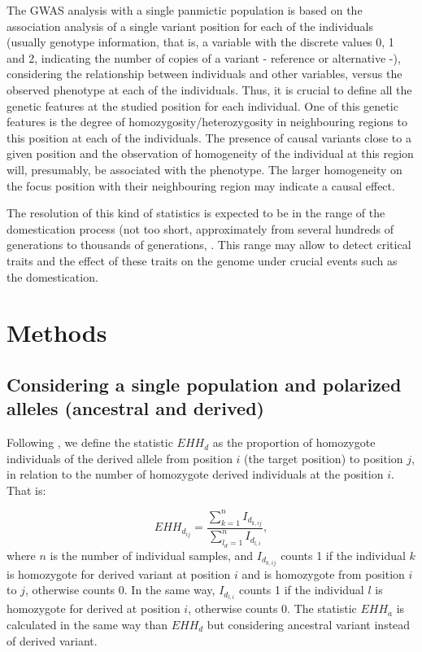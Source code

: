 \documentclass[a4paper,11pt]{article}
\begin{document}
The GWAS analysis with a single panmictic population is based on the association analysis of a single variant position for each of the individuals (usually genotype information, that is, a variable with  the discrete values 0, 1 and 2, indicating the number of copies of a variant - reference or alternative -), considering the relationship between individuals and other variables, versus the observed phenotype at each of the individuals. Thus, it is crucial to define all the genetic features at the studied position for each individual. One of this genetic features is the degree of homozygosity/heterozygosity in neighbouring regions to this position at each of the individuals. The presence of causal variants close to a given position and the observation of homogeneity of the individual at this region will, presumably, be associated with the phenotype. The larger homogeneity on the focus position with their neighbouring region may indicate a causal effect.

The resolution of this kind of statistics is expected to be in the range of the domestication process (not too short, approximately from several hundreds of generations to  thousands of generations, \citep{Sabeti:2002aa}. This range may allow to detect critical traits and the effect of these traits on the genome under crucial events such as the domestication.

\section{Methods}
\subsection{Considering a single population and polarized alleles (ancestral and derived)}
Following \citet{Sabeti:2002aa}, we define the statistic $EHH_d$ as the proportion of homozygote individuals of the derived allele from position $i$ (the target position) to position $j$, in relation to the number of homozygote derived individuals at the position $i$.  That is:

 \begin{equation}
 EHH_{d_{ij}} = \frac{\sum_{k=1}^{n}I_{d_{k,ij}}}{\sum_{l_d=1}^{n}I_{d_{l,i}}},
 \end{equation}
where $n$ is the number of individual samples, and $I_{d_{k,ij}}$ counts 1 if the individual $k$ is homozygote for derived variant at position $i$ and is homozygote from position $i$ to $j$, otherwise counts 0. In the same way, $I_{d_{l,i}}$ counts 1 if the individual $l$ is homozygote for derived at position $i$, otherwise counts 0. The statistic $EHH_a$ is calculated in the same way than $EHH_d$ but considering ancestral variant instead of derived variant.  
\end{document}
